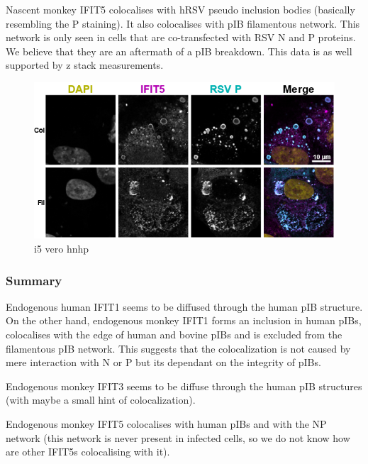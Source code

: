 Nascent monkey IFIT5 colocalises with hRSV pseudo inclusion bodies (basically resembling the P staining). It also colocalises with pIB filamentous network. This network is only seen in cells that are co-transfected with RSV N and P proteins. We believe that they are an aftermath of a pIB breakdown. This data is as well supported by z stack measurements.

\begin{figure}
    \centering
    \includegraphics[width=1\linewidth]{09. Chapter 4/Figs/03. pIB/05. i5 vero hnhp.png}
    \caption[i5 vero hnhp]{i5 vero hnhp}
    \label{fig:i5 vero hnhp}
\end{figure}

\subsubsection{Summary} \label{Summary-pib}
Endogenous human IFIT1 seems to be diffused through the human pIB structure. On the other hand, endogenous monkey IFIT1 forms an inclusion in human pIBs, colocalises with the edge of human and bovine pIBs and is excluded from the filamentous pIB network. This suggests that the colocalization is not caused by mere interaction with N or P but its dependant on the integrity of pIBs.

Endogenous monkey IFIT3 seems to be diffuse through the human pIB structures (with maybe a small hint of colocalization).

Endogenous monkey IFIT5 colocalises with human pIBs and with the NP network (this network is never present in infected cells, so we do not know how are other IFIT5s colocalising with it).